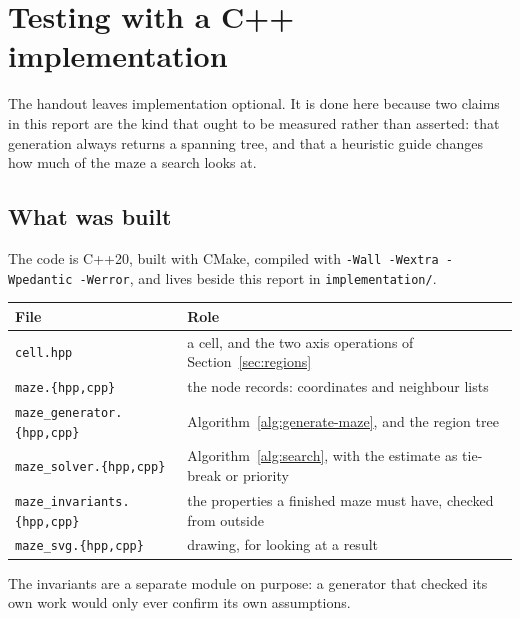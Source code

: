 \section{Testing with a C++ implementation}
\label{sec:cpp-testing}

The handout leaves implementation optional. It is done here because two claims
in this report are the kind that ought to be measured rather than asserted: that
generation always returns a spanning tree, and that a heuristic guide changes
how much of the maze a search looks at.

\subsection{What was built}

The code is C++20, built with CMake, compiled with
\texttt{-Wall -Wextra -Wpedantic -Werror}, and lives beside this report in
\texttt{implementation/}.

\begin{center}
\begin{tabular}{@{}ll@{}}
  \toprule
  File & Role \\
  \midrule
  \texttt{cell.hpp}            & a cell, and the two axis operations of
                                 Section~\ref{sec:regions} \\
  \texttt{maze.\{hpp,cpp\}}      & the node records: coordinates and neighbour lists \\
  \texttt{maze\_generator.\{hpp,cpp\}} & Algorithm~\ref{alg:generate-maze}, and
                                 the region tree \\
  \texttt{maze\_solver.\{hpp,cpp\}}    & Algorithm~\ref{alg:search}, with the
                                 estimate as tie-break or priority \\
  \texttt{maze\_invariants.\{hpp,cpp\}} & the properties a finished maze must
                                 have, checked from outside \\
  \texttt{maze\_svg.\{hpp,cpp\}}       & drawing, for looking at a result \\
  \bottomrule
\end{tabular}
\end{center}

The invariants are a separate module on purpose: a generator that checked its
own work would only ever confirm its own assumptions.

